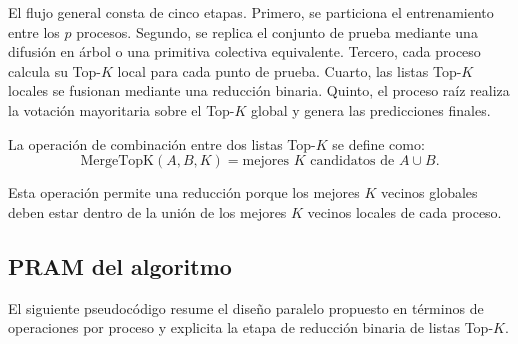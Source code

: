 \documentclass[11pt,a4paper]{article}
\begin{document}
El flujo general consta de cinco etapas. Primero, se particiona el entrenamiento entre los $p$
procesos. Segundo, se replica el conjunto de prueba mediante una difusión en árbol o una primitiva
colectiva equivalente. Tercero, cada proceso calcula su Top-$K$ local para cada punto de prueba.
Cuarto, las listas Top-$K$ locales se fusionan mediante una reducción binaria. Quinto, el proceso
raíz realiza la votación mayoritaria sobre el Top-$K$ global y genera las predicciones finales.

La operación de combinación entre dos listas Top-$K$ se define como:
\[
\text{MergeTopK}(A,B,K) = \text{mejores } K \text{ candidatos de } A \cup B.
\]

Esta operación permite una reducción porque los mejores $K$ vecinos globales deben estar dentro
de la unión de los mejores $K$ vecinos locales de cada proceso.

\subsection{PRAM del algoritmo}

El siguiente pseudocódigo resume el diseño paralelo propuesto en términos de operaciones por
proceso y explicita la etapa de reducción binaria de listas Top-$K$.
\end{document}

